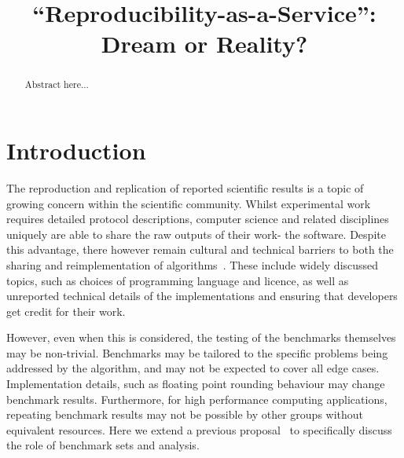\documentclass[conference]{IEEEtran}
\begin{document}

\title{``Reproducibility-as-a-Service'': Dream or Reality?}

\author{
\and
{}
}

\maketitle

\begin{abstract}
Abstract here...
\end{abstract}

\IEEEpeerreviewmaketitle

\section{Introduction}

The reproduction and replication of reported scientific results is a 
topic of growing concern within the scientific community. Whilst
experimental work requires detailed protocol descriptions, computer
science and related disciplines uniquely are able to share the raw
outputs of their work- the software. 
Despite this advantage, there however remain cultural and technical 
barriers to both the sharing and reimplementation of 
algorithms~\cite{crick-et-al_wssspe2}. These include widely discussed
topics, such as choices of programming language and licence, as well
as unreported technical details of the implementations and ensuring 
that developers get credit for their work.

However, even when this is considered, the testing of the benchmarks
themselves may be non-trivial. Benchmarks may be tailored to the 
specific problems being addressed by the algorithm, and may not be 
expected to cover all edge cases. Implementation details, such as 
floating point rounding behaviour may change benchmark results.
Furthermore, for high performance computing applications, repeating
benchmark results may not be possible by other groups without equivalent
resources. Here we extend a previous proposal~\cite{crick-et-al_wssspe2}
to specifically discuss the role of benchmark sets and analysis.
\end{document}
